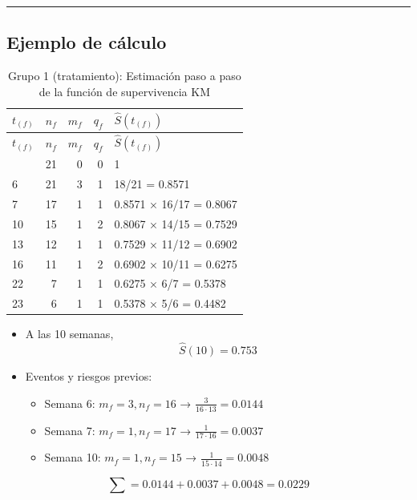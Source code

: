 \documentclass[
]{article}
\providecommand{\tightlist}{%
  \setlength{\itemsep}{0pt}\setlength{\parskip}{0pt}}
\begin{document}
\begin{center}\rule{0.5\linewidth}{0.5pt}\end{center}

\subsection{Ejemplo de cálculo}\label{ejemplo-de-cuxe1lculo}

\begin{longtable}[]{@{}lrrrl@{}}
\caption{Grupo 1 (tratamiento): Estimación paso a paso de la función de
supervivencia KM}\tabularnewline
\toprule\noalign{}
\(t_{(f)}\) & \(n_f\) & \(m_f\) & \(q_f\) & \(\hat{S}(t_{(f)})\) \\
\midrule\noalign{}
\endfirsthead
\toprule\noalign{}
\(t_{(f)}\) & \(n_f\) & \(m_f\) & \(q_f\) & \(\hat{S}(t_{(f)})\) \\
\midrule\noalign{}
\endhead
\bottomrule\noalign{}
\endlastfoot
0 & 21 & 0 & 0 & 1 \\
6 & 21 & 3 & 1 & 18/21 = 0.8571 \\
7 & 17 & 1 & 1 & 0.8571 × 16/17 = 0.8067 \\
10 & 15 & 1 & 2 & 0.8067 × 14/15 = 0.7529 \\
13 & 12 & 1 & 1 & 0.7529 × 11/12 = 0.6902 \\
16 & 11 & 1 & 2 & 0.6902 × 10/11 = 0.6275 \\
22 & 7 & 1 & 1 & 0.6275 × 6/7 = 0.5378 \\
23 & 6 & 1 & 1 & 0.5378 × 5/6 = 0.4482 \\
\end{longtable}

\begin{itemize}
\tightlist
\item
  A las 10 semanas, \[\hat{S}(10) = 0.753\]
\item
  Eventos y riesgos previos:

  \begin{itemize}
  \tightlist
  \item
    Semana 6: \(m_f = 3, n_f = 16\) → \(\frac{3}{16 \cdot 13} = 0.0144\)
  \item
    Semana 7: \(m_f = 1, n_f = 17\) → \(\frac{1}{17 \cdot 16} = 0.0037\)
  \item
    Semana 10: \(m_f = 1, n_f = 15\) →
    \(\frac{1}{15 \cdot 14} = 0.0048\)
  \end{itemize}
\end{itemize}

\[
\sum = 0.0144 + 0.0037 + 0.0048 = 0.0229
\]
\end{document}
